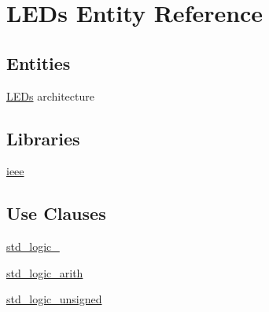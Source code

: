 \hypertarget{class_l_e_ds}{}\section{L\+E\+Ds Entity Reference}
\label{class_l_e_ds}
\subsection*{Entities}
\begin{DoxyCompactItemize}
\item 
\hyperlink{class_l_e_ds_1_1_l_e_ds}{L\+E\+Ds} architecture
\end{DoxyCompactItemize}
\subsection*{Libraries}
 \begin{DoxyCompactItemize}
\item 
\hyperlink{class_l_e_ds_a0a6af6eef40212dbaf130d57ce711256}{ieee} 
\end{DoxyCompactItemize}
\subsection*{Use Clauses}
 \begin{DoxyCompactItemize}
\item 
\hyperlink{class_l_e_ds_acd03516902501cd1c7296a98e22c6fcb}{std\+\_\+logic\+\_}   
\item 
\hyperlink{class_l_e_ds_a0f5ecc6613f63d07f7963a97b1b26095}{std\+\_\+logic\+\_\+arith}   
\item 
\hyperlink{class_l_e_ds_a598da929e807d58939b47499e8bc9fa8}{std\+\_\+logic\+\_\+unsigned}   
\end{DoxyCompactItemize}
